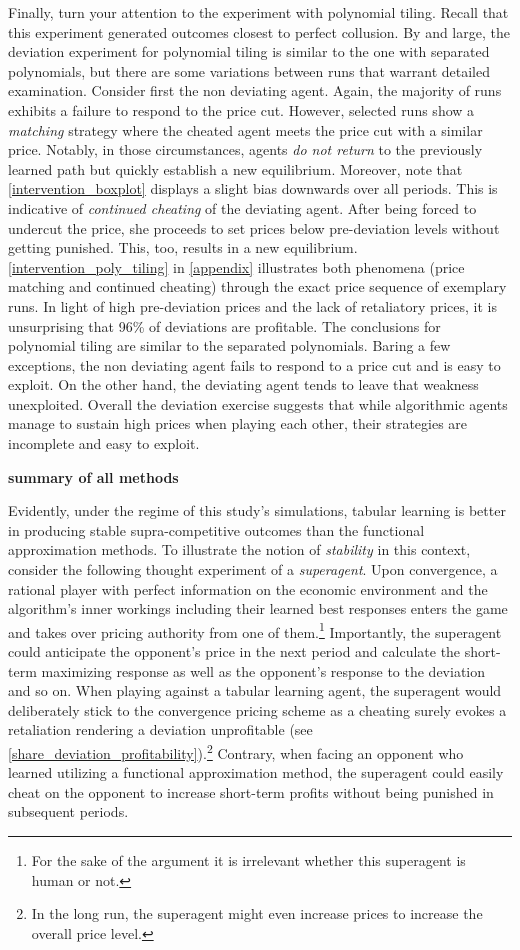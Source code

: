 Finally, turn your attention to the experiment with polynomial tiling. Recall that this experiment generated outcomes closest to perfect collusion. By and large, the deviation experiment for polynomial tiling is similar to the one with separated polynomials, but there are some variations between runs that warrant detailed examination. Consider first the non deviating agent. Again, the majority of runs exhibits a failure to respond to the price cut. However, selected runs show a \emph{matching} strategy where the cheated agent meets the price cut with a similar price. Notably, in those circumstances, agents \emph{do not return} to the previously learned path but quickly establish a new equilibrium. Moreover, note that \autoref{intervention_boxplot} displays a slight bias downwards over all periods. This is indicative of \emph{continued cheating} of the deviating agent. After being forced to undercut the price, she proceeds to set prices below pre-deviation levels without getting punished. This, too, results in a new equilibrium. \autoref{intervention_poly_tiling} in \autoref{appendix} illustrates both phenomena (price matching and continued cheating) through the exact price sequence of exemplary runs. In light of high pre-deviation prices and the lack of retaliatory prices, it is unsurprising that 96\% of deviations are profitable. The conclusions for polynomial tiling are similar to the separated polynomials. Baring a few exceptions, the non deviating agent fails to respond to a price cut and is easy to exploit. On the other hand, the deviating agent tends to leave that weakness unexploited.
Overall the deviation exercise suggests that while algorithmic agents manage to sustain high prices when playing each other, their strategies are incomplete and easy to exploit.

\textbf{summary of all methods}

Evidently, under the regime of this study's simulations, tabular learning is better in producing stable supra-competitive outcomes than the functional approximation methods. To illustrate the notion of \emph{stability} in this context, consider the following thought experiment of a \emph{superagent}. Upon convergence, a rational player with perfect information on the economic environment and the algorithm's inner workings including their learned best responses enters the game and takes over pricing authority from one of them.\footnote{For the sake of the argument it is irrelevant whether this superagent is human or not.} Importantly, the superagent could anticipate the opponent's price in the next period and calculate the short-term maximizing response as well as the opponent's response to the deviation and so on. When playing against a tabular learning agent, the superagent would deliberately stick to the convergence pricing scheme as a cheating surely evokes a retaliation rendering a deviation unprofitable (see \autoref{share_deviation_profitability}).\footnote{In the long run, the superagent might even increase prices to increase the overall price level.} Contrary, when facing an opponent who learned utilizing a functional approximation method, the superagent could easily cheat on the opponent to increase short-term profits without being punished in subsequent periods.

